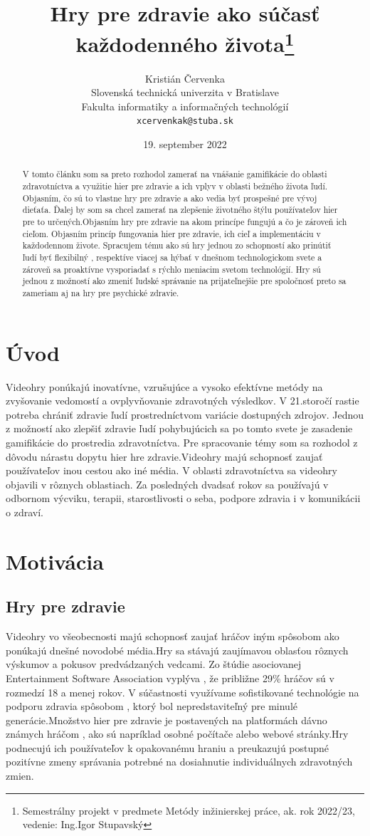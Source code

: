 \documentclass[10pt,oneside,slovak,a4paper]{article}
\title{Hry pre zdravie ako súčasť každodenného života\thanks{Semestrálny projekt v predmete Metódy inžinierskej práce, ak. rok 2022/23, vedenie: Ing.Igor Stupavský}} %
\author{Kristián Červenka\\[2pt]
	{\small Slovenská technická univerzita v Bratislave}\\
	{\small Fakulta informatiky a informačných technológií}\\
	{\small \texttt{xcervenkak@stuba.sk}}
	}
\date{\small 19. september 2022} %
\begin{document}
\maketitle

\begin{abstract}
V tomto článku som sa preto rozhodol zamerať na vnášanie gamifikácie do oblasti zdravotníctva a využitie hier pre zdravie a ich vplyv v oblasti bežného života ľudí.
Objasním, čo sú to vlastne hry pre zdravie a ako vedia byť prospešné pre vývoj dieťaťa.
Ďalej by som sa chcel zamerať na zlepšenie životného štýlu používateľov hier pre to určených.Objasním hry pre zdravie na akom princípe fungujú a čo je zároveň ich cieľom.
Objasním princíp fungovania hier pre zdravie, ich cieľ a implementáciu v každodennom živote.
Spracujem tému ako sú hry jednou zo schopností ako prinútiť ľudí byť flexibilný , respektíve viacej sa hýbať v dnešnom technologickom svete a zároveň sa proaktívne vysporiadať s rýchlo meniacim svetom technológií. 
Hry sú jednou z možností ako zmeniť ľudské správanie na prijateľnejšie pre spoločnosť preto sa zameriam aj na hry pre psychické zdravie.
\end{abstract}



\section{Úvod}
Videohry ponúkajú inovatívne, vzrušujúce a vysoko efektívne metódy na zvyšovanie vedomostí a ovplyvňovanie zdravotných výsledkov. 
V 21.storočí rastie potreba chrániť zdravie ľudí prostredníctvom variácie dostupných zdrojov.
Jednou z možností ako zlepšiť zdravie ľudí pohybujúcich sa po tomto svete je zasadenie gamifikácie do prostredia zdravotníctva. 
Pre spracovanie témy som sa rozhodol z dôvodu nárastu dopytu hier hre zdravie.Videohry majú schopnosť zaujať používateľov inou cestou ako iné média.
V oblasti zdravotníctva sa videohry objavili v rôznych oblastiach. 
Za posledných dvadsať rokov sa používajú v odbornom výcviku, terapii, starostlivosti o seba, podpore zdravia i v komunikácii o zdraví.


\section{Motivácia} 
\subsection{Hry pre zdravie}
Videohry vo všeobecnosti majú schopnosť zaujať hráčov iným spôsobom ako ponúkajú dnešné novodobé média.Hry sa stávajú zaujímavou oblasťou rôznych výskumov a pokusov predvádzaných vedcami. Zo štúdie asociovanej Entertainment Software Association \cite{PLP-Framework} vyplýva , že približne 29\% hráčov sú v rozmedzí 18 a menej rokov. 
V súčastnosti využívame sofistikované technológie na podporu zdravia spôsobom , ktorý bol nepredstaviteľný pre minulé generácie.Množstvo hier pre zdravie je postavených na platformách dávno známych hráčom , ako sú napríklad osobné počítače alebo webové stránky.Hry podnecujú ich používateľov k opakovanému hraniu a preukazujú postupné  pozitívne zmeny správania potrebné na dosiahnutie individuálnych zdravotných zmien.
\end{document}

